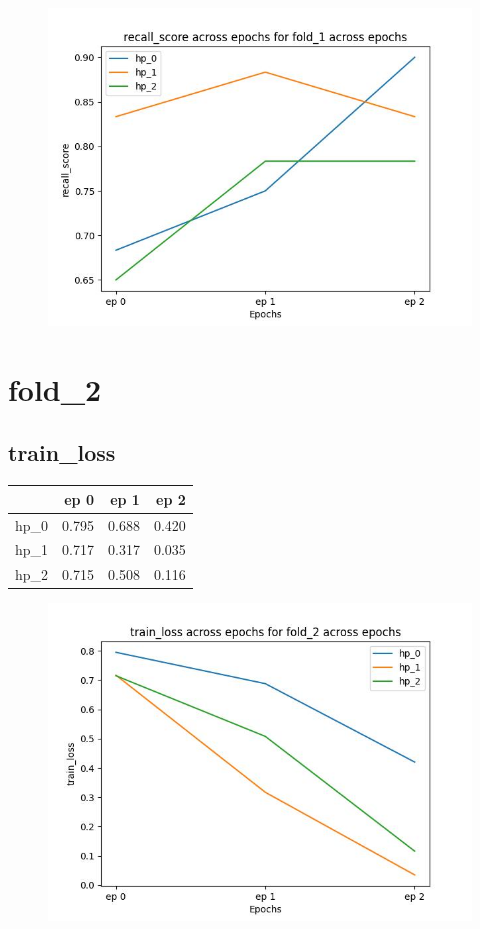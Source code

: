\documentclass{article}
\begin{document}
\begin{figure}[H]
\includegraphics[scale = 0.75]{fold_1/recall_score}
\end{figure}
\section{fold\_2}
\subsection{train\_loss}
\begin{tabular}{lrrr}
\toprule
{} &   ep 0 &   ep 1 &   ep 2 \\
\midrule
hp\_0 &  0.795 &  0.688 &  0.420 \\
hp\_1 &  0.717 &  0.317 &  0.035 \\
hp\_2 &  0.715 &  0.508 &  0.116 \\
\bottomrule
\end{tabular}

\begin{figure}[H]
\includegraphics[scale = 0.75]{fold_2/train_loss}
\end{figure}
\end{document}
